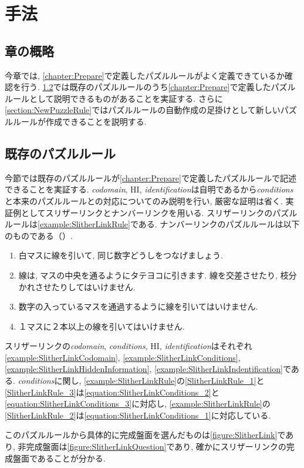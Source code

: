 \chapter{手法}\label{chapter:3}
\section{章の概略}
今章では, \cref{chapter:Prepare}で定義したパズルルールがよく定義できているか確認を行う. \cref{section:ExistsPuzzleRule}では既存のパズルルールのうち\cref{chapter:Prepare}で定義したパズルルールとして説明できるものがあることを実証する.  さらに\cref{section:NewPuzzleRule}ではパズルルールの自動作成の足掛けとして新しいパズルルールが作成できることを説明する.

\section{既存のパズルルール}\label{section:ExistsPuzzleRule}
今節では既存のパズルルールが\cref{chapter:Prepare}で定義したパズルルールで記述できることを実証する. \textit{codomain}, HI, \textit{identification}は自明であるから\textit{conditions}と本来のパズルルールとの対応についてのみ説明を行い, 厳密な証明は省く.
実証例としてスリザーリンクとナンバーリンクを用いる. スリザーリンクのパズルルールは\cref{example:SlitherLinkRule}である. ナンバーリンクのパズルルールは以下のものである（\cite{web:NumberLink}）.
\begin{example}[ナンバーリンクのパズルルール]\label{example:NumberLinkRule}\textup{}
  \begin{enumerate}
    \item 白マスに線を引いて, 同じ数字どうしをつなげましょう.\label{NumberLinkRule_1}
    \item 線は, マスの中央を通るようにタテヨコに引きます. 線を交差させたり, 枝分かれさせたりしてはいけません.\label{NumberLinkRule_2}
    \item 数字の入っているマスを通過するように線を引いてはいけません.\label{NumberLinkRule_3}
    \item １マスに２本以上の線を引いてはいけません.\label{NumberLinkRule_4}
  \end{enumerate}
\end{example}

\begin{example}[スリザーリンクの数学的記述]
  スリザーリンクの\textit{codomain}, \textit{conditions},  HI, \textit{identification}はそれぞれ\cref{example:SlitherLinkCodomain}, \cref{example:SlitherLinkConditions}, \cref{example:SlitherLinkHiddenInformation}, \cref{example:SlitherLinkIndentification}である. \textit{conditions}に関し, \cref{example:SlitherLinkRule}の\ref{SlitherLinkRule_1}と\ref{SlitherLinkRule_3}は\cref{equation:SlitherLinkConditions_2}と\cref{equation:SlitherLinkConditions_3}に対応し, \cref{example:SlitherLinkRule}の\ref{SlitherLinkRule_2}は\cref{equation:SlitherLinkConditions_1}に対応している.

  このパズルルールから具体的に完成盤面を選んだものは\cref{figure:SlitherLink}であり, 非完成盤面は\cref{figure:SlitherLinkQuestion}であり, 確かにスリザーリンクの完成盤面であることが分かる.
\end{example}

